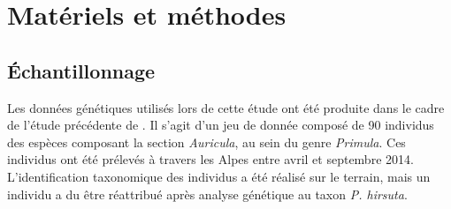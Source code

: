 
\section{Matériels et méthodes}

\subsection{Échantillonnage}

Les données génétiques utilisés lors de cette étude ont été produite dans le cadre de l'étude précédente de \citet{Boucher2016a}. 
Il s'agit d'un jeu de donnée composé de 90 individus des espèces composant la section \textit{Auricula}, au sein du genre \textit{Primula}. 
Ces individus ont été prélevés à travers les Alpes entre avril et septembre 2014. 
L'identification taxonomique des individus a été réalisé sur le terrain, mais un individu a du être réattribué après analyse génétique au taxon \textit{P. hirsuta}.

